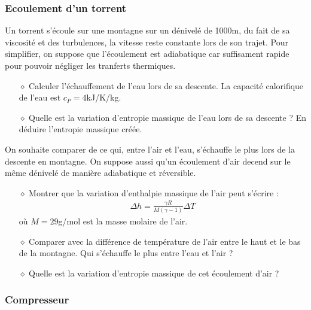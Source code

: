 \documentclass{report}
\begin{document}
\subsubsection*{Ecoulement d'un torrent}

Un torrent s'écoule sur une montagne sur un dénivelé de 1000m, du fait de sa viscosité et des turbulences, la vitesse reste constante lors de son trajet. Pour simplifier, on suppose que l'écoulement est adiabatique car suffisament rapide pour pouvoir négliger les tranferts thermiques. 
\begin{itemize}

	\item[$\diamond$] Calculer l'échauffement de l'eau lors de sa descente. La capacité calorifique de l'eau est $c_P=4$kJ/K/kg. 

	\item[$\diamond$] Quelle est la variation d'entropie massique de l'eau lors de sa descente ? En déduire l'entropie massique créée.
	
\end{itemize}

On souhaite comparer de ce qui, entre l'air et l'eau, s'échauffe le plus lors de la descente en montagne. On suppose aussi qu'un écoulement d'air decend sur le même dénivelé de manière adiabatique et réversible. 

\begin{itemize}

	\item[$\diamond$] Montrer que la variation d'enthalpie massique de l'air peut s'écrire :
	\begin{align*}
		\Delta h =\frac{\gamma R}{M(\gamma -1)}\Delta T
	\end{align*}
	où $M=29$g/mol est la masse molaire de l'air.

	\item[$\diamond$] Comparer avec la différence de température de l'air entre le haut et le bas de la montagne. Qui s'échauffe le plus entre l'eau et l'air ?
	
	\item[$\diamond$] Quelle est la variation d'entropie massique de cet écoulement d'air ? 
	
\end{itemize}

\subsubsection*{Compresseur}
\end{document}
